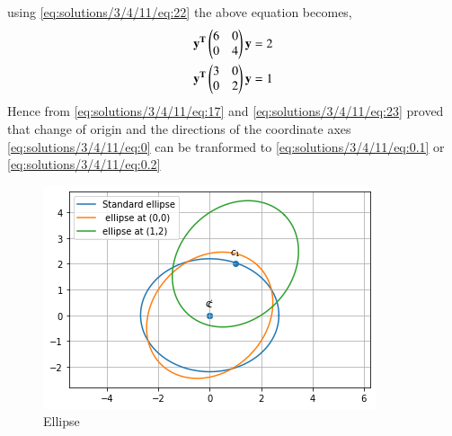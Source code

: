 using \eqref{eq:solutions/3/4/11/eq:22} the above equation becomes,
\begin{align}
\mathbf{y^T}\begin{pmatrix}6&0\\0&4\end{pmatrix}\mathbf{y}=2\\
\mathbf{y^T}\begin{pmatrix}3&0\\0&2\end{pmatrix}\mathbf{y}=1\label{eq:solutions/3/4/11/eq:23}
\end{align} 
Hence from \eqref{eq:solutions/3/4/11/eq:17} and \eqref{eq:solutions/3/4/11/eq:23} proved that change of origin and the directions of the coordinate axes \eqref{eq:solutions/3/4/11/eq:0} can be tranformed to \eqref{eq:solutions/3/4/11/eq:0.1} or \eqref{eq:solutions/3/4/11/eq:0.2}
\begin{figure}[!ht]
\centering
\includegraphics[width=\columnwidth]{./solutions/3/4/11/Ellipse.png}
\caption{Ellipse}
\label{eq:solutions/3/4/11/fig:Ellipse}
\end{figure}

